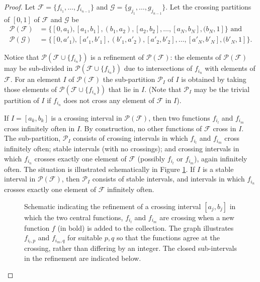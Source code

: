 \documentclass{daj}
\begin{document}
\begin{proof}
Let $\mathcal F=\{f_{i_1},\ldots,f_{i_{n-1}}\}$ and
$\mathcal G=\{g_{j_1},\ldots,g_{j_{n-1}}\}$. Let the crossing partitions
of $[0,1]$ of $\mathcal F$ and
$\mathcal G$ be
\begin{align*}
\mathcal P(\mathcal F)&=\{[0,a_1),[a_1,b_1],(b_1,a_2),
[a_2,b_2],\ldots,[a_N,b_N],(b_N,1]\}\text{ and}\\
\mathcal P(\mathcal G)&=\{[0,a'_1),[a'_1,b'_1],(b'_1,a'_2),
[a'_2,b'_2],\ldots,[a'_N,b'_N],(b'_N,1]\}.
\end{align*}

Notice that $\mathcal P(\mathcal F\cup\{f_{i_n}\})$ is a refinement
of $\mathcal P(\mathcal F)$: the elements of $\mathcal P
(\mathcal F)$ may be sub-divided in $\mathcal P(\mathcal F\cup\{f_{i_n}\})$
due to intersections of $f_{i_n}$
with elements of $\mathcal F$.
For an element $I$ of $\mathcal P(\mathcal F)$ the sub-partition $\mathcal P_I$ of $I$
is obtained by taking those elements of $\mathcal P(\mathcal F\cup \{f_{i_n}\})$ that lie in $I$. (Note that
$\mathcal P_I$ may be the trivial partition of $I$ if $f_{i_n}$ does not cross any
element of $\mathcal F$ in $I$).

If $I=[a_k,b_k]$ is a crossing interval in $\mathcal P(\mathcal F)$, then two functions $f_{i_l}$ and $f_{i_m}$
cross infinitely often in $I$. By construction, no other functions of $\mathcal F$ cross in $I$.
The sub-partition, $\mathcal P_I$ consists of crossing intervals in which $f_{i_l}$
and $f_{i_m}$ cross infinitely often;
stable intervals (with no crossings); and crossing intervals in which $f_{i_n}$ crosses exactly one
element of $\mathcal F$ (possibly $f_{i_l}$ or $f_{i_m}$), again infinitely often.
The situation is illustrated schematically in Figure \ref{fig:cross}.
If $I$ is a stable interval in $\mathcal P(\mathcal F)$, then $\mathcal P_I$ consists of stable intervals,
and intervals in which $f_{i_n}$ crosses exactly one element of $\mathcal F$ infinitely often.
\begin{figure}
\scalebox{0.6}{}
\caption{Schematic indicating the refinement of a crossing interval $[a_j,b_j]$ in which the
two central functions, $f_{i_l}$ and $f_{i_m}$ are crossing when a new function $f$ (in bold)
is added to the collection. The graph illustrates $f_{i_l,p}$ and $f_{i_m,q}$ for suitable $p,q$
so that the functions agree at the crossing, rather than differing by an integer.
The closed sub-intervals in the refinement are indicated below.}
\label{fig:cross}
\end{figure}


\end{proof}
\end{document}
